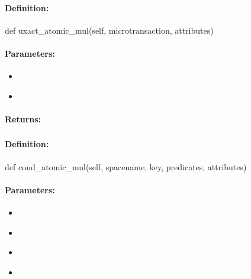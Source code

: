 \paragraph{Definition:}
\begin{pythoncode}
def uxact_atomic_mul(self, microtransaction, attributes)
\end{pythoncode}

\paragraph{Parameters:}
\begin{itemize}[noitemsep]
\item {}\\

\item {}\\

\end{itemize}

\paragraph{Returns:}


\pagebreak
\subsubsection{}
\label{api:python:cond_atomic_mul}


\paragraph{Definition:}
\begin{pythoncode}
def cond_atomic_mul(self, spacename, key, predicates, attributes)
\end{pythoncode}

\paragraph{Parameters:}
\begin{itemize}[noitemsep]
\item {}\\

\item {}\\

\item {}\\

\item {}\\

\end{itemize}

